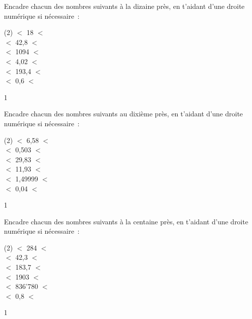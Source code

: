 \documentclass[a4paper,11pt]{report}
\begin{document}
\begin{exop}{
Encadre chacun des nombres suivants à la dizaine près, en t'aidant d'une droite numérique si nécessaire~:
\begin{tasks}[after-item-skip = 0.15em, after-skip=-2em](2)
\task \makebox[.8in]{\hrulefill} $<$ 18 $<$ \makebox[.8in]{\hrulefill}\\
\task \makebox[.8in]{\hrulefill} $<$ 42,8 $<$ \makebox[.8in]{\hrulefill}\\
\task \makebox[.8in]{\hrulefill} $<$ 1094 $<$ \makebox[.8in]{\hrulefill}\\
\task \makebox[.8in]{\hrulefill} $<$ 4,02 $<$ \makebox[.8in]{\hrulefill}\\
\task \makebox[.8in]{\hrulefill} $<$ 193,4 $<$ \makebox[.8in]{\hrulefill}\\
\task \makebox[.8in]{\hrulefill} $<$ 0,6 $<$ \makebox[.8in]{\hrulefill}
\end{tasks}
}{1}\end{exop}
\begin{exop}{
Encadre chacun des nombres suivants au dixième près, en t'aidant d'une droite numérique si nécessaire~:
\begin{tasks}[after-item-skip = 0.15em, after-skip=-2em](2)
\task \makebox[.7in]{\hrulefill} $<$ 6,58 $<$ \makebox[.7in]{\hrulefill}\\
\task \makebox[.7in]{\hrulefill} $<$ 0,503 $<$ \makebox[.7in]{\hrulefill}\\
\task \makebox[.7in]{\hrulefill} $<$ 29,83 $<$ \makebox[.7in]{\hrulefill}\\
\task \makebox[.7in]{\hrulefill} $<$ 11,93 $<$ \makebox[.7in]{\hrulefill}\\
\task \makebox[.7in]{\hrulefill} $<$ 1,49999 $<$ \makebox[.7in]{\hrulefill}\\
\task \makebox[.7in]{\hrulefill} $<$ 0,04 $<$ \makebox[.7in]{\hrulefill}\\
\end{tasks}
}{1}\end{exop}
\begin{exop}{
Encadre chacun des nombres suivants à la centaine près, en t'aidant d'une droite numérique si nécessaire~:
\begin{tasks}[after-item-skip = 0.15em, after-skip=-2em](2)
\task \makebox[.7in]{\hrulefill} $<$ 284 $<$ \makebox[.7in]{\hrulefill}\\
\task \makebox[.7in]{\hrulefill} $<$ 42,3 $<$ \makebox[.7in]{\hrulefill}\\
\task \makebox[.7in]{\hrulefill} $<$ 183,7 $<$ \makebox[.7in]{\hrulefill}\\
\task \makebox[.7in]{\hrulefill} $<$ 1903 $<$ \makebox[.7in]{\hrulefill}\\
\task \makebox[.7in]{\hrulefill} $<$ 836'780 $<$ \makebox[.7in]{\hrulefill}\\
\task \makebox[.7in]{\hrulefill} $<$ 0,8 $<$ \makebox[.7in]{\hrulefill}\\
\end{tasks}
}{1}\end{exop}
\end{document}
